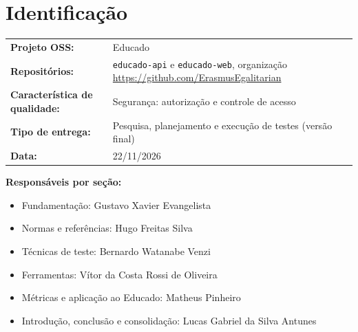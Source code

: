 \section*{Identificação}

\begin{tabularx}{\textwidth}{>{\bfseries}l X}
Projeto OSS: & Educado \\[0.2cm]
Repositórios: & \texttt{educado-api} e \texttt{educado-web}, organização
\url{https://github.com/ErasmusEgalitarian} \\[0.2cm]
Característica de qualidade: & Segurança: autorização e controle de acesso \\[0.2cm]
Tipo de entrega: & Pesquisa, planejamento e execução de testes (versão final) \\[0.2cm]
Data: & 22/11/2026
\end{tabularx}

\vspace{0.5cm}

\noindent\textbf{Responsáveis por seção:}

\begin{itemize}
  \item Fundamentação: Gustavo Xavier Evangelista
  \item Normas e referências: Hugo Freitas Silva
  \item Técnicas de teste: Bernardo Watanabe Venzi
  \item Ferramentas: Vítor da Costa Rossi de Oliveira
  \item Métricas e aplicação ao Educado: Matheus Pinheiro
  \item Introdução, conclusão e consolidação: Lucas Gabriel da Silva Antunes
\end{itemize}

\newpage
